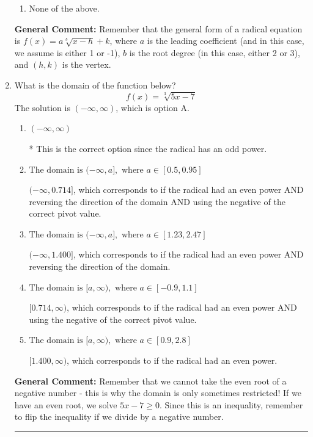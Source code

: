 \documentclass{extbook}[14pt]
\newcommand{\litem}[1]{\item #1

\rule{\textwidth}{0.4pt}}
\begin{document}
\begin{enumerate}
{\begin{enumerate}[label=\Alph*.]
\item None of the above.\end{enumerate}
\textbf{General Comment:} Remember that the general form of a radical equation is $ f(x) = a \sqrt[b]{x - h} + k $, where $a$ is the leading coefficient (and in this case, we assume is either 1 or -1), $b$ is the root degree (in this case, either 2 or 3), and $(h, k)$ is the vertex.
}
\litem{
What is the domain of the function below?
\[ f(x) = \sqrt[3]{5 x - 7} \]The solution is \( (-\infty, \infty) \), which is option A.\begin{enumerate}[label=\Alph*.]
\item \( (-\infty, \infty) \)

* This is the correct option since the radical has an odd power.
\item \( \text{The domain is } (-\infty, a], \text{   where } a \in [0.5, 0.95] \)

$(-\infty, 0.714]$, which corresponds to if the radical had an even power AND reversing the direction of the domain AND using the negative of the correct pivot value.
\item \( \text{The domain is } (-\infty, a], \text{   where } a \in [1.23, 2.47] \)

$(-\infty, 1.400]$, which corresponds to if the radical had an even power AND reversing the direction of the domain.
\item \( \text{The domain is } [a, \infty), \text{   where } a \in [-0.9, 1.1] \)

$[0.714, \infty)$, which corresponds to if the radical had an even power AND using the negative of the correct pivot value.
\item \( \text{The domain is } [a, \infty), \text{   where } a \in [0.9, 2.8] \)

$[1.400, \infty)$, which corresponds to if the radical had an even power.
\end{enumerate}

\textbf{General Comment:} Remember that we cannot take the even root of a negative number - this is why the domain is only sometimes restricted! If we have an even root, we solve $5 x - 7 \geq 0$. Since this is an inequality, remember to flip the inequality if we divide by a negative number.
}
\end{enumerate}
\end{document}
